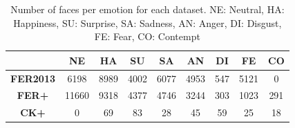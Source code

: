 \begin{table}[H]
\centering
\begin{tabular}{c|c|c|c|c|c|c|c|c|}
\cline{2-9}
                                       & \textbf{NE} & \textbf{HA} & \textbf{SU} & \textbf{SA} & \textbf{AN} & \textbf{DI} & \textbf{FE} & \textbf{CO} \\ \hline
\multicolumn{1}{|c|}{\textbf{FER2013}} & 6198        & 8989        & 4002        & 6077        & 4953        & 547         & 5121        & 0           \\ \hline
\multicolumn{1}{|c|}{\textbf{FER+}}    & 11660       & 9318        & 4377        & 4746        & 3244        & 303         & 1023        & 291         \\ \hline
\multicolumn{1}{|c|}{\textbf{CK+}}     & 0           & 69          & 83          & 28          & 45          & 59          & 25          & 18          \\ \hline
\end{tabular}
\caption{Number of faces per emotion for each dataset. NE: Neutral, HA: Happiness, SU: Surprise, SA: Sadness, AN: Anger, DI: Disgust, FE: Fear, CO: Contempt}
\label{tab:datasets}
\end{table}


